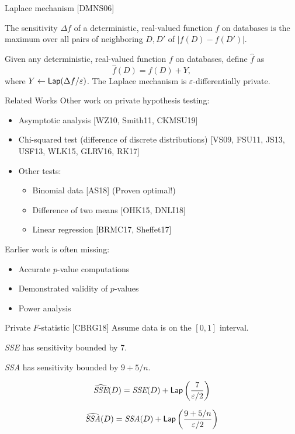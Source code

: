 \documentclass{beamer}
\newcommand{\sse}{\textit{SSE}\xspace}
\newcommand{\ssa}{\textit{SSA}\xspace}
\newcommand{\lap}{\ensuremath{{\sf Lap}}\xspace}
\begin{document}
\begin{frame}{Laplace mechanism [DMNS06]}
\pause
\begin{definition}[Sensitivity]
The sensitivity $\Delta f$ of a deterministic, real-valued function $f$ on databases is the maximum over all pairs of neighboring $D, D'$ of $| f(D) - f(D') |$.
\end{definition}

\pause
\begin{theorem}
Given any deterministic, real-valued function $f$ on databases, define $\widehat{f}$ as
$$\widehat{f}(D) = f(D) + Y,$$
where $Y \leftarrow \lap(\Delta f/\varepsilon)$. The Laplace mechanism is $\varepsilon$-differentially private.
\end{theorem}
\end{frame}

\begin{frame}{Related Works}
    Other work on private hypothesis testing:\pause
\begin{itemize}
\item Asymptotic analysis [WZ10, Smith11, CKMSU19] \pause
\item Chi-squared test (difference of discrete distributions) [VS09, FSU11, JS13, USF13, WLK15, GLRV16, RK17] \pause
\item Other tests: \pause
\begin{itemize}
\item Binomial data [AS18] (Proven optimal!) \pause
\item Difference of two means [OHK15, DNLI18] \pause
\item Linear regression [BRMC17, Sheffet17] \pause
\end{itemize}
\end{itemize}
Earlier work is often missing: \pause
\begin{itemize}
\item Accurate $p$-value computations \pause
\item Demonstrated validity of $p$-values \pause
\item Power analysis
\end{itemize}
\end{frame}

\begin{frame}{Private $F$-statistic [CBRG18]}
\pause
Assume data is on the $[0,1]$ interval. \pause
\begin{theorem}
\sse has sensitivity bounded by 7.
\end{theorem}
\begin{theorem}
\ssa has sensitivity bounded by $9 + 5/n$.
\end{theorem}
\pause
$$\widehat{\sse}(D) = \sse(D) + \lap\left(\frac{7}{\varepsilon/2}\right) $$

$$\widehat{\ssa}(D) = \ssa(D) + \lap\left(\frac{9+5/n}{\varepsilon/2}\right) $$ 
\end{frame}
\end{document}
